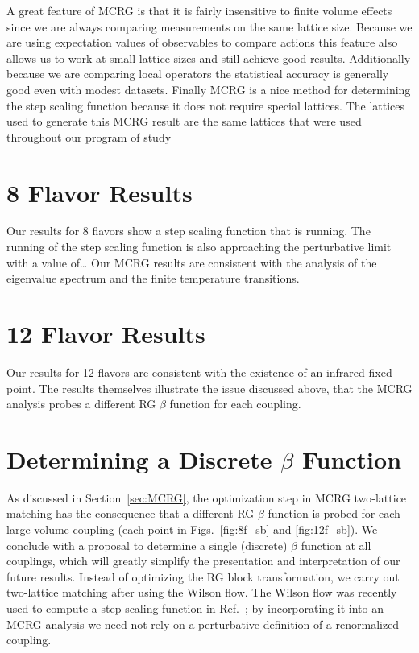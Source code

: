 \documentclass{PoS}
\newcommand{\refcite}[1]{Ref.~\cite{#1}}
\newcommand{\secref}[1]{Section~\ref{#1}}
\begin{document}
A great feature of MCRG is that it is fairly insensitive to finite volume effects since we are always comparing measurements on the same lattice size.
Because we are using expectation values of observables to compare actions this feature also allows us to work at small lattice sizes and still achieve good results.
Additionally because we are comparing local operators the statistical accuracy is generally good even with modest datasets.
Finally MCRG is a nice method for determining the step scaling function because it does not require special lattices.
The lattices used to generate this MCRG result are the same lattices that were used throughout our program of study

\section{8 Flavor Results}
Our results for 8 flavors show a step scaling function that is running.
The running of the step scaling function is also approaching the perturbative limit with a value of\dots
Our MCRG results are consistent with the analysis of the eigenvalue spectrum and the finite temperature transitions.

\section{12 Flavor Results}
Our results for 12 flavors are consistent with the existence of an infrared fixed point.
The results themselves illustrate the issue discussed above, that the MCRG analysis probes a different RG $\beta$ function for each coupling.

\section{Determining a Discrete $\beta$ Function}
As discussed in \secref{sec:MCRG}, the optimization step in MCRG two-lattice matching has the consequence that a different RG $\beta$ function is probed for each large-volume coupling (each point in Figs.~\ref{fig:8f_sb} and \ref{fig:12f_sb}).
We conclude with a proposal to determine a single (discrete) $\beta$ function at all couplings, which will greatly simplify the presentation and interpretation of our future results.
Instead of optimizing the RG block transformation, we carry out two-lattice matching after using the Wilson flow.
The Wilson flow was recently used to compute a step-scaling function in \refcite{Fodor:2012td}; by incorporating it into an MCRG analysis we need not rely on a perturbative definition of a renormalized coupling.
\end{document}
